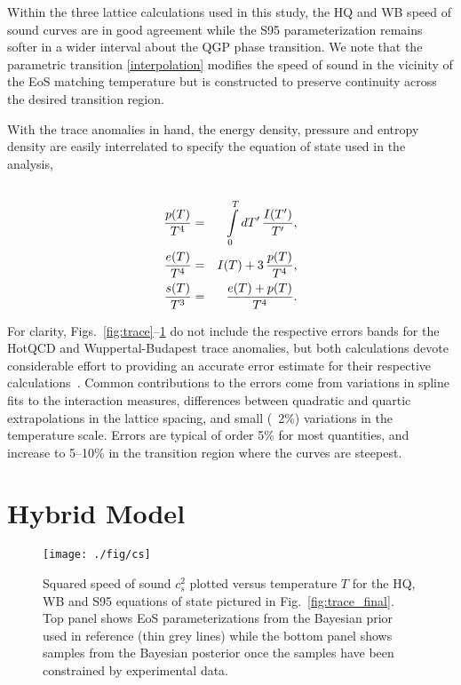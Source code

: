 \documentclass[aps,prc,reprint,amsmath,nofootinbib,superscriptaddress]{revtex4-1}
\begin{document}
Within the three lattice calculations used in this study, the HQ and WB speed of sound curves are in good agreement while the S95 parameterization remains softer in a wider interval about the QGP phase transition. We note that the parametric transition \eqref{interpolation} modifies the speed of sound in the vicinity of the EoS matching temperature but is constructed to preserve continuity across the desired transition region.

With the trace anomalies in hand, the energy density, pressure and entropy density are easily interrelated to specify the equation of state used in the analysis,
\begin{eqnarray}
 \label{conversion}
 \cr \frac{p(T)}{T^4} &=& \int\limits_0^T dT'\, \frac{I(T')}{T'}, \\
 \frac{e(T)}{T^4} &=& I(T) + 3\, \frac{p(T)}{T^4}, \\
 \frac{s(T)}{T^3} &=& \frac{e(T) + p(T)}{T^4}. 
\end{eqnarray}
 
For clarity, Figs.~\ref{fig:trace}--\ref{fig:cs} do not include the respective errors bands for the HotQCD and Wuppertal-Budapest trace anomalies, but both calculations devote considerable effort to providing an accurate error estimate for their respective calculations~\cite{Borsanyi:2013bia,Bazavov:2014pvz}.  Common contributions to the errors
come from variations in spline fits to the interaction measures, differences between quadratic and quartic extrapolations in the lattice spacing, and
small (~2\%) variations in the temperature scale.  Errors are typical of order 5\% for most quantities, and increase to 5--10\% in the transition region
where the curves are steepest.

\section{Hybrid Model}

\begin{figure}[b]
  \texttt{[image: ./fig/cs]}
  \caption{\label{fig:cs} Squared speed of sound $c_s^2$ plotted versus temperature $T$ for the HQ, WB and S95 equations of state pictured in 
           Fig.~\ref{fig:trace_final}. Top panel shows EoS parameterizations from the Bayesian prior used in reference \cite{Pratt:2015zsa} (thin grey lines)
           while the bottom panel shows samples from the Bayesian posterior once the samples have been constrained by experimental data.
          }
\end{figure}
\end{document}
